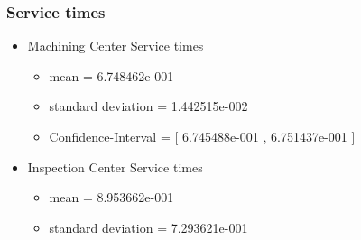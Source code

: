 \documentclass[aps,letterpaper,10pt]{revtex4}
\begin{document}
        \subsubsection{Service times}
            \begin{itemize}
                \item Machining Center Service times
                    \begin{itemize}
                        \item mean = 6.748462e-001
                        \item standard deviation = 1.442515e-002
                        \item Confidence-Interval = [ 6.745488e-001 , 6.751437e-001 ]
                    \end{itemize}
                    \begin{figure}[htp]
                        \begin{center}
                        \end{center}
                    \end{figure}
                \item Inspection Center Service times
                    \begin{itemize}
                        \item mean = 8.953662e-001
                        \item standard deviation = 7.293621e-001

\end{itemize}
\end{itemize}
\end{document}
